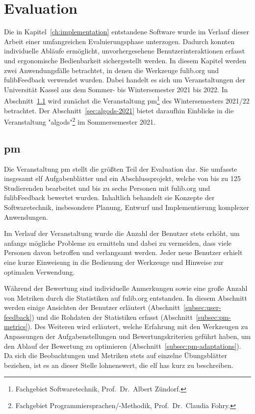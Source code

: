 \chapter{Evaluation}\label{ch:evaluation}

Die in Kapitel~\ref{ch:implementation} entstandene Software wurde im Verlauf dieser Arbeit einer umfangreichen Evaluierungsphase unterzogen.
Dadurch konnten individuelle Abläufe ermöglicht, unvorhergesehene Benutzerinteraktionen erfasst und ergonomische Bedienbarkeit sichergestellt werden.
In diesem Kapitel werden zwei Anwendungsfälle betrachtet, in denen die Werkzeuge fulib.org und fulibFeedback verwendet wurden.
Dabei handelt es sich um Veranstaltungen der Universität Kassel aus dem Sommer- bis Wintersemester 2021 bis 2022.
In Abschnitt~\ref{sec:pm-2021-2022} wird zunächst die Veranstaltung \ac{pm}\footnote{
    Fachgebiet Softwaretechnik, Prof.\ Dr.\ Albert Zündorf.
} des Wintersemesters 2021/22 betrachtet.
Der Abschnitt~\ref{sec:algods-2021} bietet daraufhin Einblicke in die Veranstaltung "\acl{algods}"\footnote{
    Fachgebiet Programmiersprachen/-Methodik, Prof.\ Dr.\ Claudia Fohry.\label{fn:fg-plm}
} im Sommersemester 2021.

\section{\acl{pm}}\label{sec:pm-2021-2022}

Die Veranstaltung \ac{pm} stellt die größten Teil der Evaluation dar.
Sie umfasste insgesamt elf Aufgabenblätter und ein Abschlussprojekt, welche von bis zu 125 Studierenden bearbeitet und bis zu sechs Personen mit fulib.org und fulibFeedback bewertet wurden.
Inhaltlich behandelt sie Konzepte der Softwaretechnik, insbesondere Planung, Entwurf und Implementierung komplexer Anwendungen.

Im Verlauf der Veranstaltung wurde die Anzahl der Benutzer stets erhöht, um anfangs mögliche Probleme zu ermitteln und dabei zu vermeiden, dass viele Personen davon betroffen und verlangsamt werden.
Jeder neue Benutzer erhielt eine kurze Einweisung in die Bedienung der Werkzeuge und Hinweise zur optimalen Verwendung.

Während der Bewertung sind individuelle Anmerkungen sowie eine große Anzahl von Metriken durch die Statistiken auf fulib.org entstanden.
In diesem Abschnitt werden einige Ansichten der Benutzer erläutert (Abschnitt~\ref{subsec:user-feedback}) und die Rohdaten der Statistiken erfasst (Abschnitt~\ref{subsec:pm-metrics}).
Des Weiteren wird erläutert, welche Erfahrung mit den Werkzeugen zu Anpassungen der Aufgabenstellungen und Bewertungskriterien geführt haben, um den Ablauf der Bewertung zu optimieren (Abschnitt~\ref{subsec:pm-adaptations}).
Da sich die Beobachtungen und Metriken stets auf einzelne Übungsblätter beziehen, ist es an dieser Stelle lohnenswert, die elf \acp{ha} kurz zu beschreiben.

